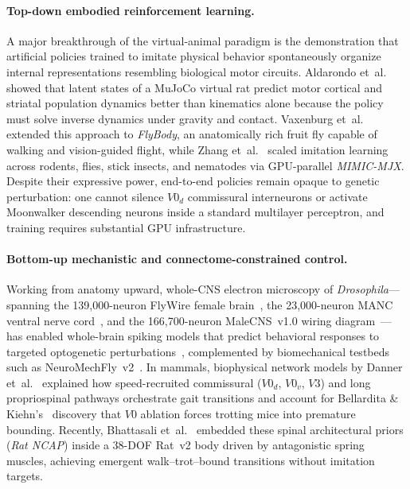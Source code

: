 \documentclass[10pt,twocolumn,letterpaper]{article}
\begin{document}
\paragraph{Top-down embodied reinforcement learning.}
A major breakthrough of the virtual-animal paradigm is the demonstration that artificial policies trained to imitate physical behavior spontaneously organize internal representations resembling biological motor circuits. Aldarondo et~al.~\cite{aldarondo2024virtualrodent} showed that latent states of a MuJoCo virtual rat predict motor cortical and striatal population dynamics better than kinematics alone because the policy must solve inverse dynamics under gravity and contact. Vaxenburg et~al.~\cite{vaxenburg2025flybody} extended this approach to \emph{FlyBody}, an anatomically rich fruit fly capable of walking and vision-guided flight, while Zhang et~al.~\cite{zhang2025mimicmjx} scaled imitation learning across rodents, flies, stick insects, and nematodes via GPU-parallel \emph{MIMIC-MJX}. Despite their expressive power, end-to-end policies remain opaque to genetic perturbation: one cannot silence $V0_d$ commissural interneurons or activate Moonwalker descending neurons inside a standard multilayer perceptron, and training requires substantial GPU infrastructure.

\paragraph{Bottom-up mechanistic and connectome-constrained control.}
Working from anatomy upward, whole-CNS electron microscopy of \emph{Drosophila}---spanning the 139,000-neuron FlyWire female brain~\cite{dorkenwald2024flywire}, the 23,000-neuron MANC ventral nerve cord~\cite{takemura2024manc}, and the 166,700-neuron MaleCNS~v1.0 wiring diagram~\cite{berg2025malecns}---has enabled whole-brain spiking models that predict behavioral responses to targeted optogenetic perturbations~\cite{shiu2024drosophilalif}, complemented by biomechanical testbeds such as NeuroMechFly~v2~\cite{wangchen2024neuromechfly2}. In mammals, biophysical network models by Danner et~al.~\cite{danner2017spinal} explained how speed-recruited commissural ($V0_d$, $V0_v$, $V3$) and long propriospinal pathways orchestrate gait transitions and account for Bellardita \& Kiehn's~\cite{bellardita2015v0} discovery that $V0$ ablation forces trotting mice into premature bounding. Recently, Bhattasali et~al.~\cite{bhattasali2026ratncap} embedded these spinal architectural priors (\emph{Rat NCAP}) inside a 38-DOF Rat~v2 body driven by antagonistic spring muscles, achieving emergent walk--trot--bound transitions without imitation targets.
\end{document}
